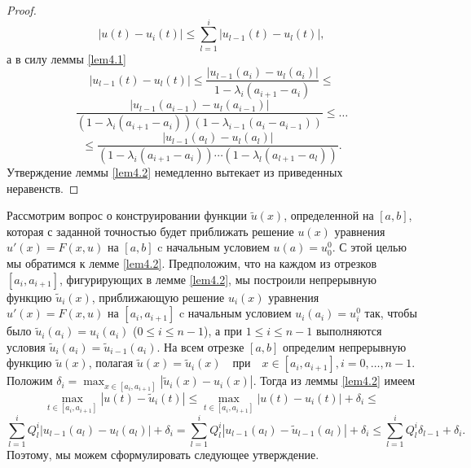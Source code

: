 \documentclass{article}
\numberwithin{equation}{section}
\theoremstyle{plain}
\theoremstyle{definition}
\newtheorem{proof}{Доказательство}\def\theproof{}
\begin{document}
\begin{fulltext}
\begin{proof}
  $$
  |u(t)-u_i(t)|\le \sum_{l=1}^{i}|u_{l-1}(t)-u_l(t)|,
  $$
  а в силу леммы \ref{lem4.1}
  $$
  |u_{l-1}(t)-u_l(t)|\le \frac{|u_{l-1}(a_i)-u_{l}(a_i)|}{1-\lambda_i(a_{i+1}-a_i)}\le
  $$
  $$
  \frac{|u_{l-1}(a_{i-1})-u_{l}(a_{i-1})|}
  {(1-\lambda_i(a_{i+1}-a_i))(1-\lambda_{i-1}(a_{i}-a_{i-1}))}\le\ldots
  $$
  $$
  \le\frac{|u_{l-1}(a_{l})-u_{l}(a_{l})|}
  {(1-\lambda_i(a_{i+1}-a_i))\cdots(1-\lambda_{l}(a_{l+1}-a_{l}))}.
  $$
 Утверждение леммы \ref{lem4.2} немедленно вытекает из приведенных неравенств.
\end{proof}
Рассмотрим вопрос о конструировании функции $\tilde u(x)$, определенной на $[a,b]$, которая с заданной точностью будет   приближать  решение $u(x)$ уравнения  $u'(x)=F(x,u)$  на $[a,b]$  c начальным условием  $u(a)=u^0_0$. С этой целью мы обратимся к лемме \ref{lem4.2}.
Предположим, что на каждом из отрезков $[a_i,a_{i+1}]$, фигурирующих в лемме \ref{lem4.2}, мы построили непрерывную функцию $\tilde u_i(x)$,  приближающую решение $u_i(x)$ уравнения $u'(x)=F(x,u)$   на $[a_i,a_{i+1}]$  c начальным условием  $u_i(a_i)=u_i^0$ так, чтобы  было  $\tilde u_i(a_i)= u_i(a_i)$ ($0\le i\le n-1$), а при $1\le i\le n-1$ выполняются условия $\tilde u_i(a_i)=\tilde u_{i-1}(a_i)$.  На всем отрезке $[a,b]$ определим непрерывную функцию $\tilde u(x)$, полагая
$\tilde u(x)=\tilde u_i(x)\quad \text{при}\quad x\in [a_i,a_{i+1}], i=0,\ldots, n-1$.
 Положим $\delta_i=\max_{x\in[a_i,a_{i+1}]}|\tilde u_i(x)- u_i(x)|$. Тогда из леммы \ref{lem4.2} имеем
$$
\max_{t\in[a_i,a_{i+1}]}|u(t)-\tilde u_i(t)|\le \max_{t\in[a_i,a_{i+1}]}|u(t)- u_i(t)|+\delta_i\le
$$
$$
 \sum_{l=1}^{i}Q_{l}^{i}|u_{l-1}(a_{l})-u_{l}(a_l)|+\delta_i=
  \sum_{l=1}^{i}Q_{l}^{i}|u_{l-1}(a_{l})-\tilde u_{l-1}(a_{l})| +\delta_i\le
 \sum_{l=1}^{i}Q_{l}^{i}\delta_{l-1}+\delta_i.
$$
 Поэтому, мы можем сформулировать следующее утверждение.


\end{fulltext}
\end{document}
